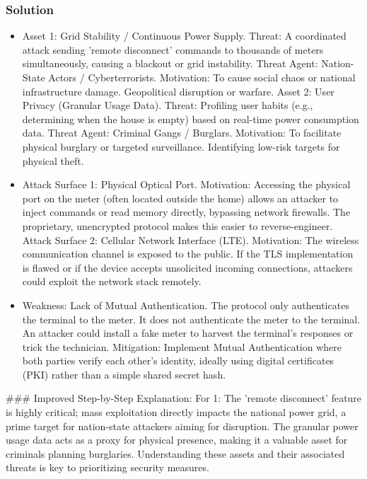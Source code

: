 \documentclass{article}
\begin{document}
\subsubsection*{Solution}
\begin{itemize}
    \item[\textbf{1.}] Asset 1: Grid Stability / Continuous Power Supply. Threat: A coordinated attack sending 'remote disconnect' commands to thousands of meters simultaneously, causing a blackout or grid instability. Threat Agent: Nation-State Actors / Cyberterrorists. Motivation: To cause social chaos or national infrastructure damage. Geopolitical disruption or warfare. Asset 2: User Privacy (Granular Usage Data). Threat: Profiling user habits (e.g., determining when the house is empty) based on real-time power consumption data. Threat Agent: Criminal Gangs / Burglars. Motivation: To facilitate physical burglary or targeted surveillance. Identifying low-risk targets for physical theft.
    \item[\textbf{1.2}] Attack Surface 1: Physical Optical Port. Motivation: Accessing the physical port on the meter (often located outside the home) allows an attacker to inject commands or read memory directly, bypassing network firewalls. The proprietary, unencrypted protocol makes this easier to reverse-engineer. Attack Surface 2: Cellular Network Interface (LTE). Motivation: The wireless communication channel is exposed to the public. If the TLS implementation is flawed or if the device accepts unsolicited incoming connections, attackers could exploit the network stack remotely.
    \item[\textbf{1.3}] Weakness: Lack of Mutual Authentication. The protocol only authenticates the terminal to the meter. It does not authenticate the meter to the terminal. An attacker could install a fake meter to harvest the terminal's responses or trick the technician. Mitigation: Implement Mutual Authentication where both parties verify each other's identity, ideally using digital certificates (PKI) rather than a simple shared secret hash.

\end{itemize}
\#\#\# Improved Step-by-Step Explanation:
For 1: The 'remote disconnect' feature is highly critical; mass exploitation directly impacts the national power grid, a prime target for nation-state attackers aiming for disruption. The granular power usage data acts as a proxy for physical presence, making it a valuable asset for criminals planning burglaries. Understanding these assets and their associated threats is key to prioritizing security measures.
\end{document}
